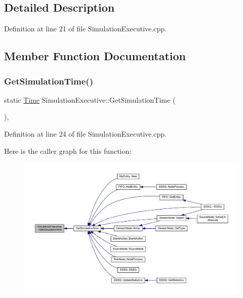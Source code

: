 \subsection{Detailed Description}


Definition at line 21 of file Simulation\+Executive.\+cpp.



\subsection{Member Function Documentation}
\mbox{\label{class_simulation_executive_aae5817b0bb67ac5453f3953174d20d9a}} 
\subsubsection{\texorpdfstring{Get\+Simulation\+Time()}{GetSimulationTime()}}
{\footnotesize\ttfamily static \hyperlink{_simulation_executive_8h_ac2d3e0ba793497bcca555c7c2cf64ff3}{Time} Simulation\+Executive\+::\+Get\+Simulation\+Time (\begin{DoxyParamCaption}{ }\end{DoxyParamCaption})\hspace{0.3cm}{\ttfamily [inline]}, {\ttfamily [static]}}



Definition at line 24 of file Simulation\+Executive.\+cpp.

Here is the caller graph for this function\+:
\nopagebreak
\begin{figure}[H]
\begin{center}
\leavevmode
\includegraphics[width=350pt]{class_simulation_executive_aae5817b0bb67ac5453f3953174d20d9a_icgraph}
\end{center}
\end{figure}
\mbox{\label{class_simulation_executive_a6b97d77619c537a462c53ad32ed95004}} 
